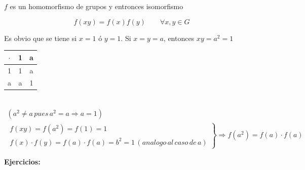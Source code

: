 \documentclass{article}
\begin{document}
$f$ es un homomorfismo de grupos y entronces isomorfismo 

\begin{equation*}
f(xy)=f(x)f(y) \qquad \forall x,y \in G
\end{equation*}

Es obvio que se tiene si $x=1$ ó $y=1$. Si $x=y=a$, entonces $xy=a^2=1$ \\

\begin{tabular}{c | c c}
$\cdot$ & 1 & a \\
\hline
1 & 1 & a \\
a & a & 1
\end{tabular} \\

\begin{gather*}
(a^2\neq a \, pues\, a^2=a \Rightarrow a=1) \\
\left. \begin{array}{c}
f(xy)=f(a^2)=f(1)=1 \\
f(x)\cdot f(y)=f(a)\cdot f(a)=b^2=1 \, (analogo \, al \, caso \, de \, a)
\end{array} \right\rbrace
\Rightarrow f(a^2)=f(a)\cdot f(a)
\end{gather*}

\textbf{Ejercicios:} 
\end{document}
